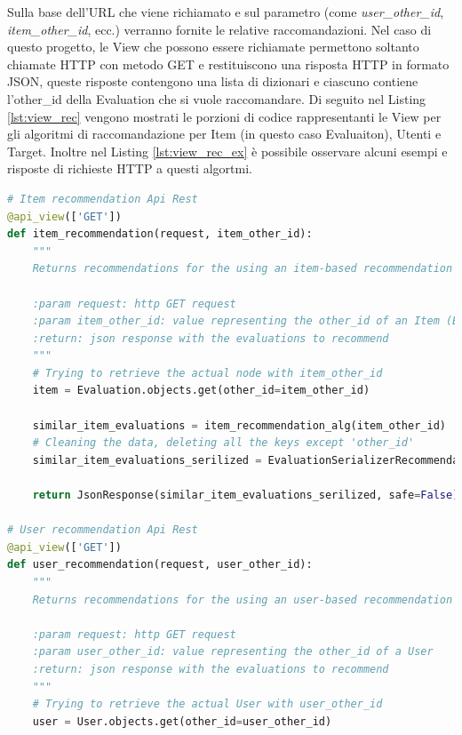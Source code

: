 Sulla base dell'URL che viene richiamato e sul parametro (come \textit{user\_other\_id}, \textit{item\_other\_id}, ecc.) verranno fornite le 
relative raccomandazioni. Nel caso di questo progetto, le View che possono essere richiamate permettono soltanto chiamate HTTP con metodo GET 
e restituiscono una risposta HTTP in formato JSON, queste risposte contengono una lista di dizionari e ciascuno contiene l'other\_id della Evaluation 
che si vuole raccomandare. Di seguito nel Listing \ref{lst:view_rec} vengono mostrati le porzioni di codice rappresentanti 
le View per gli algoritmi di raccomandazione per Item (in questo caso Evaluaiton), Utenti e Target. Inoltre nel Listing \ref{lst:view_rec_ex} è 
possibile osservare alcuni esempi e risposte di richieste HTTP a questi algortmi.\hfill\break
\lstset{style=python_code_style}
\begin{lstlisting}[language=Python, label=lst:view_rec, caption={Porzione parziale del codice contenuto nelle View per implementare
    i sistemi di raccomandazione.}]
# Item recommendation Api Rest
@api_view(['GET'])
def item_recommendation(request, item_other_id):
    """
    Returns recommendations for the using an item-based recommendation algorithm for the Evaluation `item_other_id`
 
    :param request: http GET request
    :param item_other_id: value representing the other_id of an Item (Evaluation)
    :return: json response with the evaluations to recommend
    """
    # Trying to retrieve the actual node with item_other_id
    item = Evaluation.objects.get(other_id=item_other_id)
 
    similar_item_evaluations = item_recommendation_alg(item_other_id)
    # Cleaning the data, deleting all the keys except 'other_id'
    similar_item_evaluations_serilized = EvaluationSerializerRecommendation(similar_item_evaluations, many=True).data
 
    return JsonResponse(similar_item_evaluations_serilized, safe=False)
 
# User recommendation Api Rest
@api_view(['GET'])
def user_recommendation(request, user_other_id):
    """
    Returns recommendations for the using an user-based recommendation algorithm for the user `user_other_id`
 
    :param request: http GET request
    :param user_other_id: value representing the other_id of a User
    :return: json response with the evaluations to recommend
    """
    # Trying to retrieve the actual User with user_other_id
    user = User.objects.get(other_id=user_other_id)
 

\end{lstlisting}
